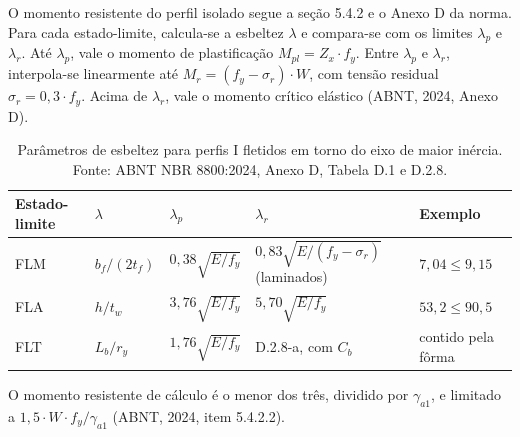 \documentclass[11pt,a4paper]{article}
\begin{document}
O momento resistente do perfil isolado segue a seção 5.4.2 e o Anexo D da norma. Para cada estado-limite, calcula-se a esbeltez $\lambda$ e compara-se com os limites $\lambda_p$ e $\lambda_r$. Até $\lambda_p$, vale o momento de plastificação $M_{pl} = Z_x \cdot f_y$. Entre $\lambda_p$ e $\lambda_r$, interpola-se linearmente até $M_r = (f_y - \sigma_r)\cdot W$, com tensão residual $\sigma_r = 0{,}3\cdot f_y$. Acima de $\lambda_r$, vale o momento crítico elástico (ABNT, 2024, Anexo D).

\begin{table}[!htbp]
  \centering
  \caption{Parâmetros de esbeltez para perfis I fletidos em torno do eixo de maior inércia. Fonte: ABNT NBR 8800:2024, Anexo D, Tabela D.1 e D.2.8.}
  \label{tab:esbeltez-perfil}
  \small
  \begin{tabularx}{\linewidth}{lllll}
    \toprule
    \textbf{Estado-limite} & $\lambda$ & $\lambda_p$ & $\lambda_r$ & \textbf{Exemplo} \\
    \midrule
    FLM & $b_f/(2 t_f)$ & $0{,}38\sqrt{E/f_y}$ & $0{,}83\sqrt{E/(f_y - \sigma_r)}$ (laminados) & $7{,}04 \le 9{,}15$ \\
    FLA & $h/t_w$ & $3{,}76\sqrt{E/f_y}$ & $5{,}70\sqrt{E/f_y}$ & $53{,}2 \le 90{,}5$ \\
    FLT & $L_b/r_y$ & $1{,}76\sqrt{E/f_y}$ & D.2.8-a, com $C_b$ & contido pela fôrma \\
    \bottomrule
  \end{tabularx}
\end{table}

O momento resistente de cálculo é o menor dos três, dividido por $\gamma_{a1}$, e limitado a $1{,}5\cdot W\cdot f_y/\gamma_{a1}$ (ABNT, 2024, item 5.4.2.2).
\end{document}
